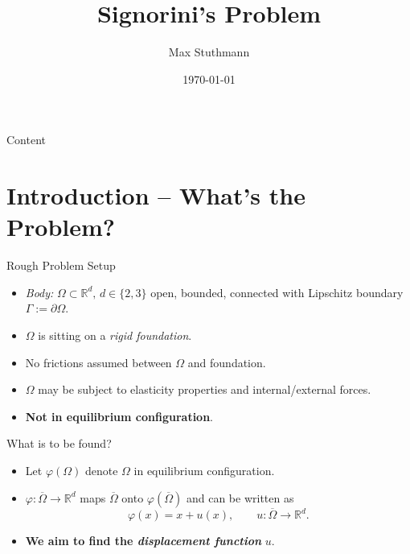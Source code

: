 \documentclass[10pt,aspectratio=169]{beamer}
\title{Signorini's Problem}
\author{Max Stuthmann}
\date{\tiny \today}
\def\R{{\mathbb R}}
\begin{document}
\begin{frame}[plain]
	\titlepage
\end{frame}

\begin{frame}{Content}
	\tableofcontents
\end{frame}

\section{Introduction -- What's the Problem?}
\begin{frame}{Rough Problem Setup}
	\begin{itemize}
		\item {\em Body: } $\Omega\subset\R^d,\, d\in\{2,3\}$ open, bounded, connected with Lipschitz boundary $\Gamma:= \partial\Omega$.
		\item $\Omega$ is sitting on a {\em rigid foundation}.
		\item No frictions assumed between $\Omega$ and foundation.
		\item $\Omega$ may be subject to elasticity properties and internal/external forces.
		\item {\bf Not in equilibrium configuration}.
	\end{itemize}
	\begin{figure}[!h]
		\centering
		
	\end{figure}
\end{frame}

\begin{frame}{What is to be found?}
	\begin{itemize}
		\item Let $\varphi(\Omega)$ denote $\Omega$ in equilibrium configuration.
		\item $\varphi:\overline{\Omega}\to\R^d$ maps $\overline{\Omega}$ onto $\varphi(\overline{\Omega})$ and can be written as
		      \begin{equation*}
			      \varphi(x) = x+ u(x),\qquad u:\overline{\Omega}\to\R^d.
		      \end{equation*}
		\item {\bf We aim to find the {\em displacement function}} $u$.
	\end{itemize}
	\begin{figure}[!h]
		\centering
		
	\end{figure}
\end{frame}
\end{document}

